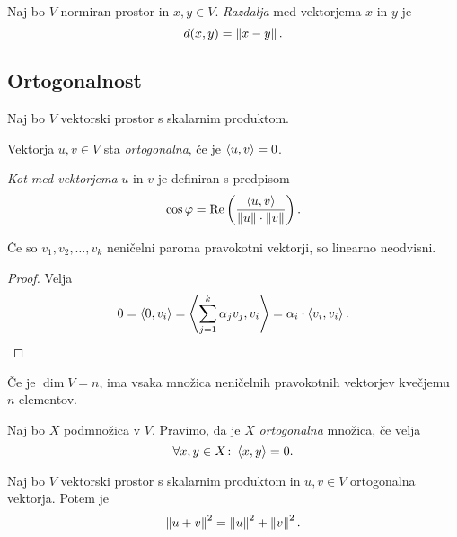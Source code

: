 \documentclass[12pt, a4paper]{article}
\begin{document}
\begin{definicija}
Naj bo $V$ normiran prostor in $x,y\in V$. \emph{Razdalja} med vektorjema $x$ in $y$ je
\[
d(x,y)=\left\lVert x-y\right\rVert.
\]
\end{definicija}

\newpage

\subsection{Ortogonalnost}

Naj bo $V$ vektorski prostor s skalarnim produktom.

\begin{definicija}
Vektorja $u,v\in V$ sta \emph{ortogonalna}, če je $\left\langle u,v\right\rangle=0$.
\end{definicija}

\begin{definicija}
\emph{Kot med vektorjema} $u$ in $v$ je definiran s predpisom
\[
\cos\varphi=\operatorname{Re}\left(\frac{\left\langle u,v\right\rangle}{\left\lVert u\right\rVert\cdot\left\lVert v\right\rVert}\right).
\]
\end{definicija}

\begin{trditev}
Če so $v_1,v_2,\dots,v_k$ neničelni paroma pravokotni vektorji, so linearno neodvisni.
\end{trditev}

\begin{proof}
Velja
\[
0=\left\langle 0,v_i\right\rangle=\left\langle \sum_{j=1}^k\alpha_jv_j,v_i\right\rangle=\alpha_i\cdot\left\langle v_i,v_i\right\rangle.\qedhere
\]
\end{proof}

\begin{posledica}
Če je $\dim V=n$, ima vsaka množica neničelnih pravokotnih vektorjev kvečjemu $n$ elementov.
\end{posledica}

\begin{definicija}
Naj bo $X$ podmnožica v $V$. Pravimo, da je $X$ \emph{ortogonalna} množica, če velja
\[
\forall x,y\in X\colon \left\langle x,y\right\rangle=0.
\]
\end{definicija}

\begin{izrek}[Pitagora]
Naj bo $V$ vektorski prostor s skalarnim produktom in $u,v\in V$ ortogonalna vektorja. Potem je
\[
\left\lVert u+v\right\rVert^2=\left\lVert u\right\rVert^2+\left\lVert v\right\rVert^2.
\]
\end{izrek}
\end{document}
